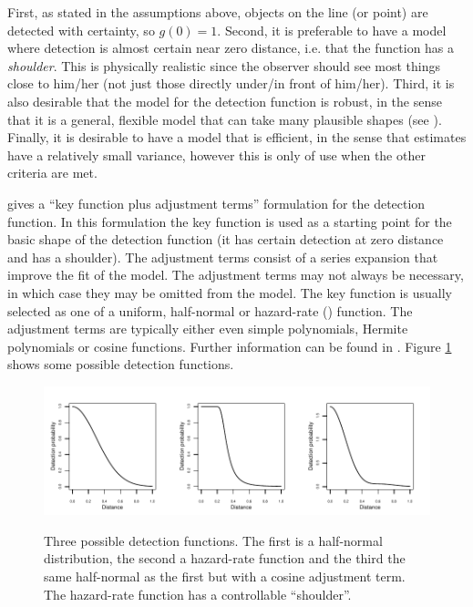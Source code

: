 First, as stated in the assumptions above, objects on the line (or point) are detected with certainty, so $g(0)=1$. Second, it is preferable to have a model where detection is almost certain near zero distance, i.e. that the function has a \textit{shoulder}. This is physically realistic since the observer should see most things close to him/her (not just those directly under/in front of him/her). Third, it is also desirable that the model for the detection function is robust, in the sense that it is a general, flexible model that can take many plausible shapes (see \cite[p. 41]{IDS}). Finally, it is desirable to have a model that is efficient, in the sense that estimates have a relatively small variance, however this is only of use when the other criteria are met.

 gives a ``key function plus adjustment terms'' formulation for the detection function. In this formulation the key function is used as a starting point for the basic shape of the detection function (it has certain detection at zero distance and has a shoulder). The adjustment terms consist of a series expansion that improve the fit of the model. The adjustment terms may not always be necessary, in which case they may be omitted from the model. The key function is usually selected as one of a uniform, half-normal or hazard-rate (\cite{buckland85}) function. The adjustment terms are typically either even simple polynomials, Hermite polynomials or cosine functions. Further information can be found in . Figure \ref{ds-detfct-examples} shows some possible detection functions.

\begin{figure}
\centering
\includegraphics{intro/figs/detfct-examples.pdf}\\
\caption{Three possible detection functions. The first is a half-normal distribution, the second a hazard-rate function and the third the same half-normal as the first but with a cosine adjustment term. The hazard-rate function has a controllable ``shoulder''.}
\label{ds-detfct-examples}
\end{figure}

